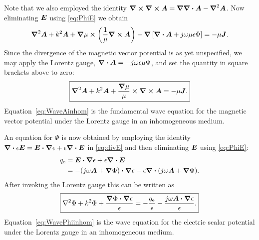 Note that we also employed the identity $\boldsymbol{\nabla} \boldsymbol{\times}\boldsymbol{\nabla} \boldsymbol{\times}\boldsymbol{A} = 
  \boldsymbol{\nabla}\boldsymbol{\nabla} \boldsymbol{\cdot}\boldsymbol{A} - \boldsymbol{\nabla}^2\boldsymbol{A}$.
Now eliminating $\boldsymbol{E}$ using \eqref{eq:PhiE} we obtain
\begin{equation}
  \boldsymbol{\nabla}^2\boldsymbol{A} + k^2 \boldsymbol{A} + \boldsymbol{\nabla}\mu \boldsymbol{\times}
  \left(
    \frac{1}{\mu} \boldsymbol{\nabla} \boldsymbol{\times}\boldsymbol{A}
  \right)
  - \boldsymbol{\nabla} 
  \left[
    \boldsymbol{\nabla} \boldsymbol{\cdot}\boldsymbol{A} + j\omega\mu\epsilon\Phi
  \right]
  = -\mu\boldsymbol{J}.
\end{equation}
Since the divergence of the magnetic vector potential is as yet unspecified,
we may apply the Lorentz gauge, $\boldsymbol{\nabla} \boldsymbol{\cdot}\boldsymbol{A} = -j\omega\epsilon\mu\Phi$,
and set the quantity in square brackets above to zero:
\begin{equation}
  \boxed{%
  \vlaplace\A + k^2 \A + \frac{\gradient\mu}{\mu} \cross \curl\A
  = -\mu\J.  \label{eq:WaveAinhom}
  }
\end{equation}
Equation~\eqref{eq:WaveAinhom} is the fundamental wave equation for 
the magnetic vector potential under the Lorentz gauge in an inhomogeneous
medium.  

An equation for $\Phi$ is now obtained by employing the
identity $\boldsymbol{\nabla} \boldsymbol{\cdot} \epsilon\boldsymbol{E} = \boldsymbol{E}\boldsymbol{\cdot}\boldsymbol{\nabla} \epsilon
+ \epsilon \boldsymbol{\nabla} \boldsymbol{\cdot}\boldsymbol{E}$ in \eqref{eq:divE} and then
eliminating $\boldsymbol{E}$ using \eqref{eq:PhiE}:
\begin{align}
  q_{\text{e}}
  &= \boldsymbol{E} \boldsymbol{\cdot} \boldsymbol{\nabla} \epsilon + \epsilon \boldsymbol{\nabla} \boldsymbol{\cdot}\boldsymbol{E} \notag \\
  &= -(j\omega\boldsymbol{A} + \boldsymbol{\nabla}\Phi) \boldsymbol{\cdot} \boldsymbol{\nabla}\epsilon
  - \epsilon \boldsymbol{\nabla} \boldsymbol{\cdot} (j\omega\boldsymbol{A} + \boldsymbol{\nabla}\Phi).
\end{align}
After invoking the Lorentz gauge this can be written as
\begin{equation}
  \boxed{%
  \laplace\Phi + k^2\Phi + \frac{\gradient\Phi \bdot \gradient\epsilon}{\epsilon}
  = 
  -\frac{\qe}{\epsilon} - \frac{j\omega\A \bdot \gradient\epsilon}{\epsilon}.
  } \label{eq:WavePhiinhom}
\end{equation}
Equation~\eqref{eq:WavePhiinhom} is the wave equation for 
the electric scalar potential under the Lorentz gauge in an inhomogeneous
medium.  

